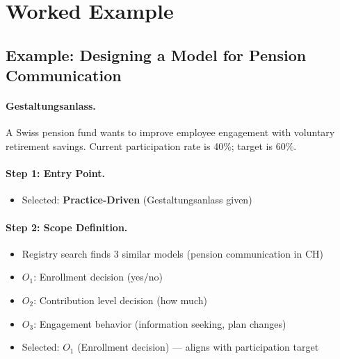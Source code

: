 
\section{Worked Example}
\label{sec:eee-example}

\subsection{Example: Designing a Model for Pension Communication}

\paragraph{Gestaltungsanlass.} A Swiss pension fund wants to improve employee
engagement with voluntary retirement savings. Current participation rate is 40\%;
target is 60\%.

\paragraph{Step 1: Entry Point.}
\begin{itemize}
\item Selected: \textbf{Practice-Driven} (Gestaltungsanlass given)
\end{itemize}

\paragraph{Step 2: Scope Definition.}
\begin{itemize}
\item Registry search finds 3 similar models (pension communication in CH)
\item $O_1$: Enrollment decision (yes/no)
\item $O_2$: Contribution level decision (how much)
\item $O_3$: Engagement behavior (information seeking, plan changes)
\item Selected: $O_1$ (Enrollment decision) --- aligns with participation target
\end{itemize}

